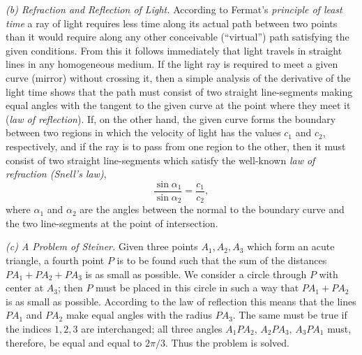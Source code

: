 \emph{(b) Refraction and Reflection of Light.} According to Fermat's \emph{principle of least time} a ray of light requires less time along its actual path between two points than it would require along any other conceivable (``virtual'') path satisfying the given conditions. From this it follows immediately that light travels in straight lines in any homogeneous medium. If the light ray is required to meet a given curve (mirror) without crossing it, then a simple analysis of the derivative of the light time shows that the path must consist of two straight line-segments making equal angles with the tangent to the given curve at the point where they meet it (\emph{law of reflection}). If, on the other hand, the given curve forms the boundary between two regions in which the velocity of light has the values $c_1$ and $c_2$, respectively, and if the ray is to pass from one region to the other, then it must consist of two straight line-segments which satisfy the well-known \emph{law of refraction (Snell's law)},
\[
\frac{\sin\alpha_1}{\sin\alpha_2}=\frac{c_1}{c_2},
\]
where $\alpha_1$ and $\alpha_2$ are the angles between the normal to the boundary curve and the two line-segments at the point of intersection.

\emph{(c) A Problem of Steiner.} Given three points $A_1,A_2,A_3$ which form an acute triangle, a fourth point $P$ is to be found such that the sum of the distances $PA_1+PA_2+PA_3$ is as small as possible. We consider a circle through $P$ with center at $A_3$; then $P$ must be placed in this circle in such a way that $PA_1+PA_2$ is as small as possible. According to the law of reflection this means that the lines $PA_1$ and $PA_2$ make equal angles with the radius $PA_3$. The same must be true if the indices $1,2,3$ are interchanged; all three angles $A_1PA_2$, $A_2PA_3$, $A_3PA_1$ must, therefore, be equal and equal to $2\pi/3$. Thus the problem is solved.

